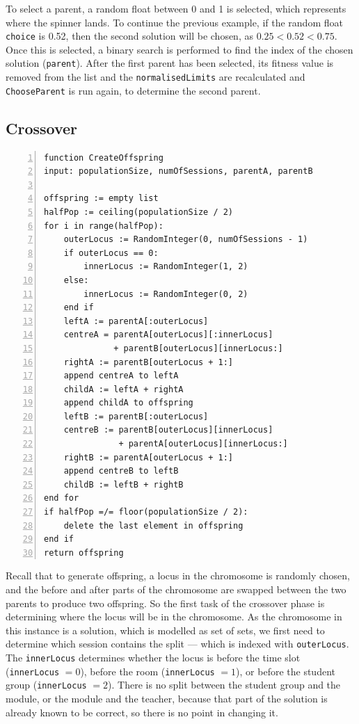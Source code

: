 \documentclass[a4paper, 12pt]{report}
\begin{document}
To select a parent, a random float between 0 and 1 is selected, which represents
where the spinner lands.
To continue the previous example, if the random float \verb|choice| is 0.52, 
then the second solution will be chosen, as \( 0.25 < 0.52 < 0.75 \).
Once this is selected, a binary search is performed to find the index of the 
chosen solution (\verb|parent|). After the first parent has been selected, its 
fitness value is removed from the list and the \verb|normalisedLimits| are 
recalculated and \verb|ChooseParent| is run again, to determine the second 
parent.

\subsection{Crossover}

\begin{Verbatim}[numbers=left, fontsize=\footnotesize]
function CreateOffspring
input: populationSize, numOfSessions, parentA, parentB

offspring := empty list
halfPop := ceiling(populationSize / 2)
for i in range(halfPop):
    outerLocus := RandomInteger(0, numOfSessions - 1)
    if outerLocus == 0:
        innerLocus := RandomInteger(1, 2)
    else:
        innerLocus := RandomInteger(0, 2)
    end if
    leftA := parentA[:outerLocus]
    centreA = parentA[outerLocus][:innerLocus] 
	          + parentB[outerLocus][innerLocus:]
    rightA := parentB[outerLocus + 1:]
    append centreA to leftA
    childA := leftA + rightA
    append childA to offspring
    leftB := parentB[:outerLocus]
    centreB := parentB[outerLocus][innerLocus]
               + parentA[outerLocus][innerLocus:]
    rightB := parentA[outerLocus + 1:]
    append centreB to leftB
    childB := leftB + rightB
end for
if halfPop =/= floor(populationSize / 2):
    delete the last element in offspring
end if
return offspring
\end{Verbatim}

Recall that to generate offspring, a locus in the chromosome is randomly chosen,
and the before and after parts of the chromosome are swapped between the two 
parents to produce two offspring.
So the first task of the crossover phase is determining where the locus will be 
in the chromosome.
As the chromosome in this instance is a solution, which is modelled as set of 
sets, we first need to determine which session contains the split --- which is 
indexed with \verb|outerLocus|.
The \verb|innerLocus| determines whether the locus is before the time slot
(\verb|innerLocus| \( = 0\)), before the room (\verb|innerLocus| \( = 1 \)), or
before the student group (\verb|innerLocus| \(=2\)). There is no split between
the student group and the module, or the module and the teacher, because that 
part of the solution is already known to be correct, so there is no point in
changing it.
\end{document}
